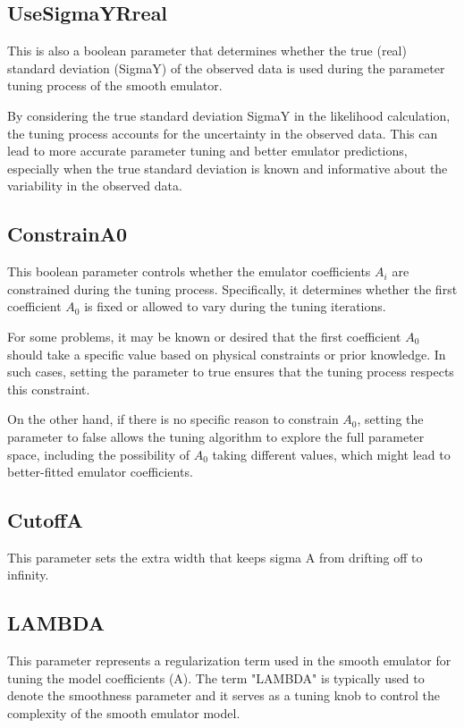 \documentclass[12pt]{article}
\numberwithin{equation}{section}
\numberwithin{figure}{section}
\begin{document}
\subsection{UseSigmaYRreal}  

This is also a boolean parameter that determines whether the true (real) standard deviation (SigmaY) of the observed data is used during the parameter tuning process of the smooth emulator.

By considering the true standard deviation SigmaY in the likelihood calculation, the tuning process accounts for the uncertainty in the observed data. This can lead to more accurate parameter tuning and better emulator predictions, especially when the true standard deviation is known and informative about the variability in the observed data.



\subsection{ConstrainA0}
 This boolean parameter controls whether the emulator coefficients $A_i$ are constrained during the tuning process. Specifically, it determines whether the first coefficient $A_0$ is fixed or allowed to vary during the tuning iterations.  

For some problems, it may be known or desired that the first coefficient $A_0$ should take a specific value based on physical constraints or prior knowledge. In such cases, setting the parameter to true ensures that the tuning process respects this constraint.

On the other hand, if there is no specific reason to constrain $A_0$, setting the parameter to false allows the tuning algorithm to explore the full parameter space, including the possibility of $A_0$ taking different values, which might lead to better-fitted emulator coefficients.\\

\subsection{CutoffA}
This parameter sets the extra width that keeps sigma A from drifting off to infinity.  

\subsection{LAMBDA}

This parameter represents a regularization term used in the smooth emulator for tuning the model coefficients (A). The term "LAMBDA" is typically used to denote the smoothness parameter and it serves as a tuning knob to control the complexity of the smooth emulator model.
\end{document}
